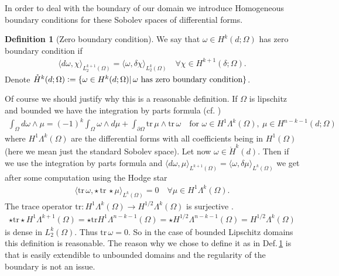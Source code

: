 \documentclass[12pt,a4paper]{article}
\numberwithin{equation}{subsection}
\numberwithin{lemma}{subsection}
\theoremstyle{definition}
\newtheorem{definition}[lemma]{Definition}
\begin{document}
In order to deal with the boundary of our domain we introduce Homogeneous
boundary conditions for these Sobolev spaces of differential forms.

\begin{definition}[Zero boundary condition] \label{def:zero_boundary_condition}
    We say that $\omega \in H^k(d;\Omega)$ has zero boundary condition if
    \begin{align*}
        \langle d\omega,\chi \rangle _{L^{k+1}_2(\Omega)}
        =  \langle \omega,\delta\chi \rangle _{L^k_2(\Omega)}
        \quad \forall \chi \in H^{k+1}(\delta;\Omega). 
    \end{align*}
    Denote $\mathring{H}^k(d;\Omega) \vcentcolon= \{ \omega \in H^k(d;\Omega)|\,
    \omega \text{ has zero boundary condition} \}$. 
\end{definition}
Of course we should justify why this is a reasonable definition. If $\Omega$ 
is lipschitz and bounded we have the integration by parts formula 
(cf. \cite[Thm.~6.3]{arnold})
\begin{align*}
    \int_\Omega d\omega \wedge \mu 
    = (-1)^k \int_\Omega \omega \wedge d \mu  + \int_{\partial\Omega} 
    \text{tr}\,\mu \wedge \text{tr}\,\omega \quad \text{for } \omega \in 
    H^1\Lambda^k(\Omega),\ \mu \in H^{n-k-1}(d;\Omega)  
\end{align*} 
where $H^1\Lambda^k(\Omega)$ are the differential forms with all coefficients
being in $H^1(\Omega)$ (here we mean just the standard Sobolev space). 
Let now $\omega \in \mathring{H}^k(d)$. Then if we use
the integration by parts formula and 
$\langle d\omega,\mu \rangle_{L^{k+1}(\Omega)} = 
\langle \omega, \delta \mu \rangle_{L^k(\Omega)}$ we get 
after some computation using the Hodge star
\begin{align*}
    \langle \text{tr}\,\omega, 
        \star\,\text{tr}\,\star\mu \rangle_{L^k(\Omega)}
    = 0 \quad \forall \mu \in H^1\Lambda^k(\Omega).
\end{align*}
The trace operator $\text{tr}: H^1\Lambda^k(\Omega) 
\rightarrow H^{1/2}\Lambda^k(\Omega)$ is surjective \cite[Thm.~6.1]{arnold}.
\begin{align*}
    \star\text{tr}\star H^1\Lambda^{k+1}(\Omega) 
    = \star \text{tr} H^1\Lambda^{n-k-1}(\Omega)
    = \star H^{1/2}\Lambda^{n-k-1}(\Omega)
    = H^{1/2}\Lambda^k(\Omega)
\end{align*}
is dense in $L^k_2(\Omega)$. Thus $\text{tr}\,\omega = 0$. So in the case 
of bounded Lipschitz domains this definition is reasonable. The reason why we
chose to define it as in Def.\,\ref{def:zero_boundary_condition} is that 
is easily extendible to unbounded domains and the regularity of the boundary
is not an issue. 
\end{document}
